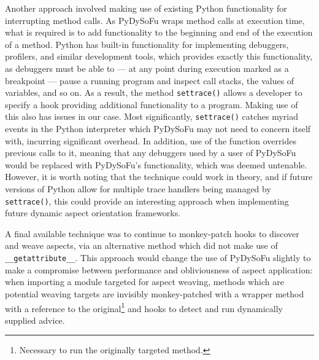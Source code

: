 Another approach involved making use of existing Python functionality for
interrupting method calls. As PyDySoFu wraps method calls at execution time,
what is required is to add functionality to the beginning and end of the
execution of a method. Python has built-in functionality for implementing
debuggers, profilers, and similar development tools, which provides exactly this
functionality, as debuggers must be able to --- at any point during execution
marked as a breakpoint --- pause a running program and inspect call stacks, the
values of variables, and so on. As a result, the method \lstinline{settrace()}
allows a developer to specify a hook providing additional functionality to a
program. Making use of this also has issues in our case. Most significantly,
\lstinline{settrace()} catches myriad events in the Python interpreter which
PyDySoFu may not need to concern itself with, incurring significant overhead. In
addition, use of the function overrides previous calls to it, meaning that any
debuggers used by a user of PyDySoFu would be replaced with PyDySoFu's
functionality, which was deemed untenable. However, it is worth noting that the
technique could work in theory, and if future versions of Python allow for
multiple trace handlers being managed by \lstinline{settrace()}, this could
provide an interesting approach when implementing future dynamic aspect
orientation frameworks.


A final available technique was to continue to monkey-patch hooks to discover
and weave aspects, via an alternative method which did not make use of
\lstinline{__getattribute__}. This approach would change the use of PyDySoFu
slightly to make a compromise between performance and obliviousness of aspect
application: when importing a module targeted for aspect weaving, methods
which are potential weaving targets are invisibly monkey-patched with a wrapper
method with a reference to the original\footnote{Necessary to run the originally
targeted method.} and hooks to detect and run dynamically supplied advice.

